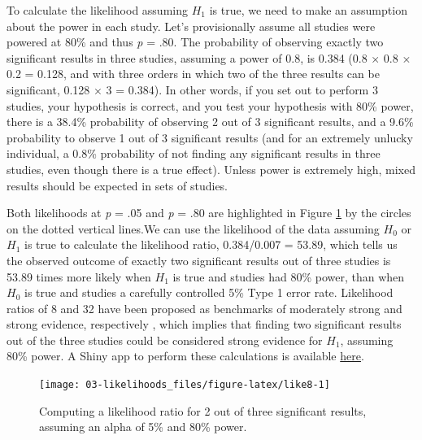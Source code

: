 \documentclass[
  oneside]{krantz}
\begin{document}
To calculate the likelihood assuming \(H_1\) is true, we need to make an assumption about the power in each study. Let's provisionally assume all studies were powered at 80\% and thus \emph{p} = .80. The probability of observing exactly two significant results in three studies, assuming a power of 0.8, is 0.384 (0.8 × 0.8 × 0.2 = 0.128, and with three orders in which two of the three results can be significant, 0.128 × 3 = 0.384). In other words, if you set out to perform 3 studies, your hypothesis is correct, and you test your hypothesis with 80\% power, there is a 38.4\% probability of observing 2 out of 3 significant results, and a 9.6\% probability to observe 1 out of 3 significant results (and for an extremely unlucky individual, a 0.8\% probability of not finding any significant results in three studies, even though there is a true effect). Unless power is extremely high, mixed results should be expected in sets of studies.

Both likelihoods at \emph{p} = .05 and \emph{p} = .80 are highlighted in Figure \ref{fig:like8} by the circles on the dotted vertical lines.We can use the likelihood of the data assuming \(H_0\) or \(H_1\) is true to calculate the likelihood ratio, 0.384/0.007 = 53.89, which tells us the observed outcome of exactly two significant results out of three studies is 53.89 times more likely when \(H_1\) is true and studies had 80\% power, than when \(H_0\) is true and studies a carefully controlled 5\% Type 1 error rate. Likelihood ratios of 8 and 32 have been proposed as benchmarks of moderately strong and strong evidence, respectively \citep{royall_statistical_1997}, which implies that finding two significant results out of the three studies could be considered strong evidence for \(H_1\), assuming 80\% power. A Shiny app to perform these calculations is available \href{https://shiny.ieis.tue.nl/mixed_results_likelihood/}{here}.



\begin{figure}

{\centering \texttt{[image: 03-likelihoods\_files/figure-latex/like8-1]} 

}

\caption{Computing a likelihood ratio for 2 out of three significant results, assuming an alpha of 5\% and 80\% power.}\label{fig:like8}
\end{figure}
\end{document}
